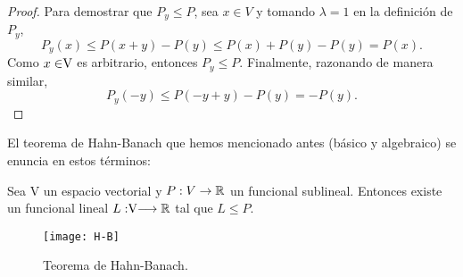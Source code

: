\begin{proof}
		Para demostrar que $ P_y \leq P $, sea $ x \in V $ y tomando $ \lambda = 1 $ en la definición de $ P_y $,
		\[ P_y(x) \leq P(x+y) - P(y) \leq P(x)+ P(y) - P(y) = P(x). \]
		Como $ x \in \vecSpace $ es arbitrario, entonces $ P_y \leq P $. Finalmente, razonando de manera similar,
		\[P_y(-y) \leq P(-y+y) - P(y) = -P(y).  \]
		
	\end{proof}
\bigskip
El teorema de Hahn-Banach que hemos mencionado antes (básico y algebraico) se enuncia en estos términos:

\bigskip
	\begin{teoremaBox}\label{H-B}
		Sea V un espacio vectorial y $P:V \rightarrow \mathbb{R}$ un funcional sublineal. Entonces existe un funcional lineal $ L:\vecSpace \longrightarrow \RR $ tal que $ L \leq P $.
	\end{teoremaBox}
\begin{figure}[h!]
	\centering
	\texttt{[image: H-B]}
	\caption{Teorema de Hahn-Banach.}
\end{figure}

